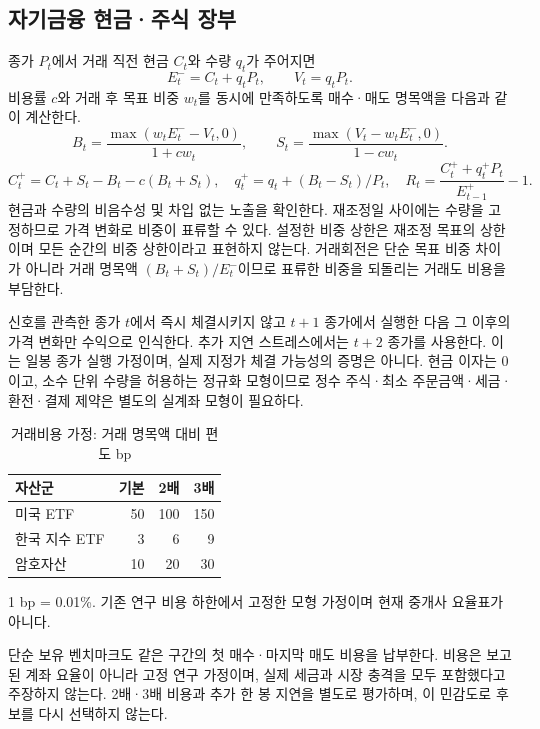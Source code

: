 \documentclass[11pt,a4paper]{article}
\begin{document}
\subsection{자기금융 현금·주식 장부}
종가 $P_t$에서 거래 직전 현금 $C_t$와 수량 $q_t$가 주어지면
\begin{equation}
 E_t^- = C_t + q_tP_t,\qquad V_t=q_tP_t.
\end{equation}
비용률 $c$와 거래 후 목표 비중 $w_t$를 동시에 만족하도록 매수·매도 명목액을 다음과 같이 계산한다.
\begin{equation}
 B_t=\frac{\max(w_tE_t^- - V_t,0)}{1+cw_t},\qquad
 S_t=\frac{\max(V_t-w_tE_t^-,0)}{1-cw_t}.
\end{equation}
\begin{equation}
 C_t^+=C_t+S_t-B_t-c(B_t+S_t),\quad
 q_t^+=q_t+(B_t-S_t)/P_t,\quad
 R_t=\frac{C_t^++q_t^+P_t}{E_{t-1}^+}-1.
\end{equation}
현금과 수량의 비음수성 및 차입 없는 노출을 확인한다. 재조정일 사이에는 수량을 고정하므로 가격 변화로 비중이 표류할 수 있다. 설정한 비중 상한은 재조정 목표의 상한이며 모든 순간의 비중 상한이라고 표현하지 않는다. 거래회전은 단순 목표 비중 차이가 아니라 거래 명목액 $(B_t+S_t)/E_t^-$이므로 표류한 비중을 되돌리는 거래도 비용을 부담한다.

신호를 관측한 종가 $t$에서 즉시 체결시키지 않고 $t+1$ 종가에서 실행한 다음 그 이후의 가격 변화만 수익으로 인식한다. 추가 지연 스트레스에서는 $t+2$ 종가를 사용한다. 이는 일봉 종가 실행 가정이며, 실제 지정가 체결 가능성의 증명은 아니다. 현금 이자는 0이고, 소수 단위 수량을 허용하는 정규화 모형이므로 정수 주식·최소 주문금액·세금·환전·결제 제약은 별도의 실계좌 모형이 필요하다.

\begin{table}[htbp]\centering
\small
\setlength{\tabcolsep}{4pt}
\caption{거래비용 가정: 거래 명목액 대비 편도 bp}
\begin{tabular}{lrrr}
\toprule
자산군 & 기본 & 2배 & 3배 \\
\midrule
미국 ETF & 50 & 100 & 150 \\
한국 지수 ETF & 3 & 6 & 9 \\
암호자산 & 10 & 20 & 30 \\
\bottomrule
\end{tabular}
\par\smallskip\begin{minipage}{\linewidth}\footnotesize 1 bp = 0.01\%. 기존 연구 비용 하한에서 고정한 모형 가정이며 현재 중개사 요율표가 아니다.\end{minipage}
\end{table}
단순 보유 벤치마크도 같은 구간의 첫 매수·마지막 매도 비용을 납부한다. 비용은 보고된 계좌 요율이 아니라 고정 연구 가정이며, 실제 세금과 시장 충격을 모두 포함했다고 주장하지 않는다. 2배·3배 비용과 추가 한 봉 지연을 별도로 평가하며, 이 민감도로 후보를 다시 선택하지 않는다.
\end{document}
